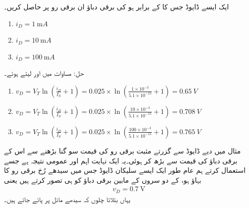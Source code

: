 ایک ایسے  ڈایوڈ جس کا   کے برابر ہو کی برقی دباؤ   ان برقی رو  پر حاصل کریں۔
\begin{enumerate}
\item
$i_D=\SI{1}{\milli A}$
\item
$i_D=\SI{10}{\milli A}$
\item
$i_D=\SI{100}{\milli A}$
\end{enumerate}
حل: مساوات   میں   اور  لیتے ہوئے۔
\begin{enumerate}
\item
$v_D=V_T \ln \left (\frac{i_D}{I_S}+1 \right ) =0.025 \times \ln \left (\frac{1 \times 10^{-3}}{5.1 \times 10^{-15}}+1 \right ) =\SI{0.65}{V}$
\item
$v_D=V_T \ln \left (\frac{i_D}{I_S}+1 \right ) =0.025 \times \ln \left (\frac{10 \times 10^{-3}}{5.1 \times 10^{-15}}+1 \right ) =\SI{0.708}{V}$
\item
$v_D=V_T \ln \left (\frac{i_D}{I_S}+1 \right ) =0.025 \times \ln \left (\frac{100 \times 10^{-3}}{5.1 \times 10^{-15}}+1 \right ) =\SI{0.765}{V}$
\end{enumerate}

مثال میں دیے ڈایوڈ سے گزرتے مثبت برقی رو  کی قیمت  سو گنا بڑھنے سے اس کے برقی دباؤ   کی قیمت  سے بڑھ کر  ہوئی۔یہ ایک نہایت اہم اور عمومی نتیجہ ہے جسے استعمال کرتے ہم عام طور ایک ایسے سلیکان ڈایوڈ   جس میں سیدھے رُخ برقی رو کا بہاؤ ہو، کے دو سروں کے مابین برقی دباؤ کو   ہی تصور کرتے ہیں یعنی
\begin{align}
v_D=\SI{0.7}{\volt}
\end{align}
یہاں بتلاتا چلوں کہ سیدھے مائل  پر  پائے جاتے ہیں۔  

